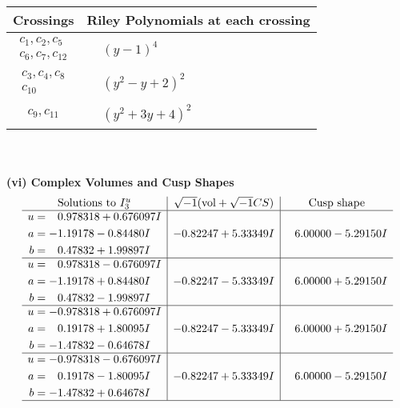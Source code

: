 \documentclass[1p]{elsarticle_modified}
\theoremstyle{definition}
\newcommand{\I}{\sqrt{-1}}
\begin{document}
\begin{tabular}{m{50pt}|m{274pt}}
Crossings & \hspace{64pt}Riley Polynomials at each crossing \\
\hline $$\begin{aligned}c_{1},c_{2},c_{5}\\c_{6},c_{7},c_{12}\end{aligned}$$&$\begin{aligned}
&(y-1)^4
\end{aligned}$\\
\hline $$\begin{aligned}c_{3},c_{4},c_{8}\\c_{10}\end{aligned}$$&$\begin{aligned}
&(y^2- y+2)^2
\end{aligned}$\\
\hline $$\begin{aligned}c_{9},c_{11}\end{aligned}$$&$\begin{aligned}
&(y^2+3 y+4)^2
\end{aligned}$\\
\hline
\end{tabular}\\~\\
\newpage\flushleft \textbf{(vi) Complex Volumes and Cusp Shapes}
$$\begin{array}{c|c|c}  
\text{Solutions to }I^u_{3}& \I (\text{vol} + \sqrt{-1}CS) & \text{Cusp shape}\\
 \hline 
\begin{aligned}
u &= \phantom{-}0.978318 + 0.676097 I \\
a &= -1.19178 - 0.84480 I \\
b &= \phantom{-}0.47832 + 1.99897 I\end{aligned}
 & -0.82247 + 5.33349 I & \phantom{-}6.00000 - 5.29150 I \\ \hline\begin{aligned}
u &= \phantom{-}0.978318 - 0.676097 I \\
a &= -1.19178 + 0.84480 I \\
b &= \phantom{-}0.47832 - 1.99897 I\end{aligned}
 & -0.82247 - 5.33349 I & \phantom{-}6.00000 + 5.29150 I \\ \hline\begin{aligned}
u &= -0.978318 + 0.676097 I \\
a &= \phantom{-}0.19178 + 1.80095 I \\
b &= -1.47832 - 0.64678 I\end{aligned}
 & -0.82247 - 5.33349 I & \phantom{-}6.00000 + 5.29150 I \\ \hline\begin{aligned}
u &= -0.978318 - 0.676097 I \\
a &= \phantom{-}0.19178 - 1.80095 I \\
b &= -1.47832 + 0.64678 I\end{aligned}
 & -0.82247 + 5.33349 I & \phantom{-}6.00000 - 5.29150 I\\
 \hline 
 \end{array}$$\newpage\newpage\renewcommand{\arraystretch}{1}
\end{document}
